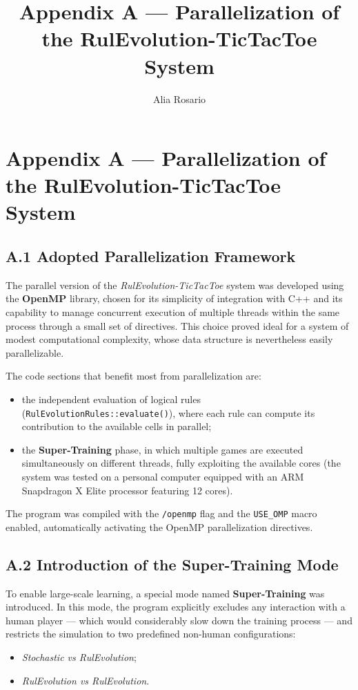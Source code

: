 \documentclass[12pt,a4paper]{article}
\title{\textbf{Appendix A — Parallelization of the RulEvolution-TicTacToe System}}
\author{Alia Rosario}
\date{}
\begin{document}
\section*{Appendix A — Parallelization of the RulEvolution-TicTacToe System}


\subsection*{A.1 Adopted Parallelization Framework}

The parallel version of the \textit{RulEvolution-TicTacToe} system was developed using the \textbf{OpenMP} library, chosen for its simplicity of integration with C++ and its capability to manage concurrent execution of multiple threads within the same process through a small set of directives.  
This choice proved ideal for a system of modest computational complexity, whose data structure is nevertheless easily parallelizable.

The code sections that benefit most from parallelization are:
\begin{itemize}
  \item the independent evaluation of logical rules (\texttt{RulEvolutionRules::evaluate()}), where each rule can compute its contribution to the available cells in parallel;
  \item the \textbf{Super-Training} phase, in which multiple games are executed simultaneously on different threads, fully exploiting the available cores (the system was tested on a personal computer equipped with an ARM Snapdragon X Elite processor featuring 12 cores).
\end{itemize}

The program was compiled with the \texttt{/openmp} flag and the \texttt{USE\_OMP} macro enabled, automatically activating the OpenMP parallelization directives.

\subsection*{A.2 Introduction of the Super-Training Mode}

To enable large-scale learning, a special mode named \textbf{Super-Training} was introduced.  
In this mode, the program explicitly excludes any interaction with a human player — which would considerably slow down the training process — and restricts the simulation to two predefined non-human configurations:
\begin{itemize}
  \item \textit{Stochastic vs RulEvolution};
  \item \textit{RulEvolution vs RulEvolution}.
\end{itemize}
\end{document}
